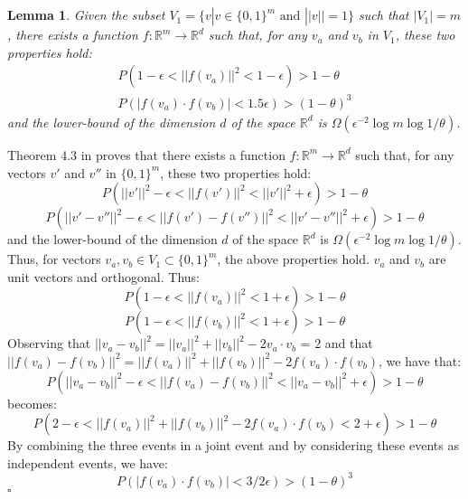 \documentclass[twoside,11pt]{article}
\newtheorem{lemma}{Lemma}
\newenvironment{proof}{{\bf Proof:}}{$\square$ }
\def\R{\mathbb{R}}
\newcounter{properties}
\begin{document}

\section{}
\label{_demonstration_}

\begin{lemma}
Given the subset $V_1 = \{v| v \in \{0,1\}^m \text{ and }  ||v||=1 \}$ such that $|V_1|=m$, there exists a function $f:\R^m \rightarrow \R^d$ such that, for any $v_a$ and $v_b$ in $V_1$, these two properties hold:
\begin{eqnarray*}
P(1-\epsilon<||f(v_a)||^2<1-\epsilon)> 1 - \theta\\
P(|f(v_a) \cdot f(v_b)| < 1.5\epsilon) > (1 - \theta)^3
\end{eqnarray*}
and the lower-bound of the dimension $d$ of the space $\R^d$ is $\Omega(\epsilon^{-2}\log m \log 1/\theta)$.
\end{lemma}
\begin{proof}
Theorem 4.3 in \cite{Jayram:2011:OBJ:2133036.2133037} proves that there exists a function $f:\R^m \rightarrow \R^d$  such that, for any vectors $v'$ and $v''$ in $\{0,1\}^m$, these two properties hold:
\begin{displaymath}
P(||v'||^2-\epsilon<||f(v')||^2<||v'||^2+\epsilon)>1-\theta
\end{displaymath}
\begin{displaymath}
P(||v'-v''||^2-\epsilon<||f(v') - f(v'')||^2<||v'-v''||^2+\epsilon)>1-\theta
\end{displaymath}
and the lower-bound of the dimension $d$ of the space $\R^d$ is $\Omega(\epsilon^{-2}\log m \log 1/\theta)$.
Thus, for vectors $v_a,v_b \in V_1 \subset \{0,1\}^m$, the above properties hold. $v_a$ and $v_b$ are unit vectors and orthogonal. Thus:
\begin{displaymath}
P(1-\epsilon<||f(v_a)||^2<1+\epsilon)> 1 - \theta
\end{displaymath}
\begin{displaymath}
P(1-\epsilon<||f(v_b)||^2<1+\epsilon)> 1 - \theta
\end{displaymath}
Observing that $||v_a-v_b||^2 = ||v_a||^2 + ||v_b||^2 - 2 v_a \cdot v_b$ = 2 and that $||f(v_a)-f(v_b)||^2 = ||f(v_a)||^2 + ||f(v_b)||^2 - 2 f(v_a)\cdot f(v_b)$, we have that:
\begin{displaymath}
P(||v_a-v_b||^2-\epsilon<||f(v_a) - f(v_b)||^2<||v_a-v_b||^2+\epsilon)>1-\theta
\end{displaymath}
becomes:
\begin{displaymath}
P(2-\epsilon<||f(v_a)||^2 + ||f(v_b)||^2 - 2 f(v_a)\cdot f(v_b)<2+\epsilon)>1-\theta
\end{displaymath}
By combining the three events in a joint event and by considering these events as independent events, we have:
\begin{displaymath}
P(|f(v_a) \cdot f(v_b)| < 3/2\epsilon) > (1 - \theta)^3
\end{displaymath}
\end{proof}
\end{document}
